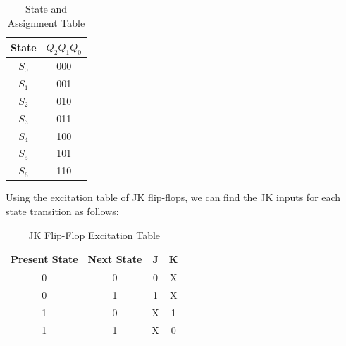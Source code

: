 \documentclass[table ]{article}
\begin{document}
\begin{table}[H]
    \centering
    \caption{State and Assignment Table}
    \begin{tabular}{|c|c|}
        \hline
        \textbf{State} & \textbf{$Q_2 Q_1 Q_0$} \\
        \hline
        $S_0$ & 000 \\
        \hline
        $S_1$ & 001 \\
        \hline
        $S_2$ & 010 \\
        \hline
        $S_3$ & 011 \\
        \hline
        $S_4$ & 100 \\
        \hline
        $S_5$ & 101 \\
        \hline
        $S_6$ & 110 \\
        \hline
    \end{tabular}
\end{table}

Using the excitation table of JK flip-flops, we can find the JK inputs for each state transition as follows:

\begin{table}[H]
    \centering
    \caption{JK Flip-Flop Excitation Table}
    \begin{tabular}{|c|c|c|c|}
        \hline
        Present State & Next State & J & K \\
        \hline
        0 & 0 & 0 & X \\
        0 & 1 & 1 & X \\
        1 & 0 & X & 1 \\
        1 & 1 & X & 0 \\
        \hline
    \end{tabular}
\end{table}
\end{document}
